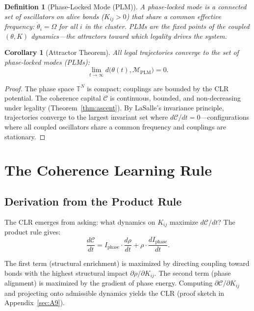 \documentclass[aps,prd,onecolumn,superscriptaddress,floatfix,12pt]{revtex4-2}
\newcommand{\Iphase}{I_{\text{phase}}}
\newtheorem{corollary}{Corollary}[section]
\newtheorem{definition}{Definition}[section]
\begin{document}
\begin{definition}[Phase-Locked Mode (PLM)]\label{def:plm}
A \emph{phase-locked mode} is a connected set of oscillators on alive bonds ($K_{ij} > 0$) that share a common effective frequency: $\dot{\theta}_i = \Omega$ for all $i$ in the cluster. PLMs are the fixed points of the coupled $(\theta, K)$ dynamics---the attractors toward which legality drives the system.
\end{definition}

\begin{corollary}[Attractor Theorem]\label{cor:attractor}
All legal trajectories converge to the set of phase-locked modes (PLMs):
\begin{equation}
\lim_{t \to \infty} d\bigl(\theta(t), \mathcal{M}_{\text{PLM}}\bigr) = 0.
\end{equation}
\end{corollary}

\begin{proof}
The phase space $\mathbb{T}^N$ is compact; couplings are bounded by the CLR potential. The coherence capital $\mathcal{C}$ is continuous, bounded, and non-decreasing under legality (Theorem~\ref{thm:ascent}). By LaSalle's invariance principle, trajectories converge to the largest invariant set where $d\mathcal{C}/dt = 0$---configurations where all coupled oscillators share a common frequency and couplings are stationary.
\end{proof}

\section{The Coherence Learning Rule}\label{sec:2}

\subsection{Derivation from the Product Rule}\label{sec:2-1}

The CLR emerges from asking: what dynamics on $K_{ij}$ maximize $d\mathcal{C}/dt$? The product rule gives:
\begin{equation}
\frac{d\mathcal{C}}{dt} = \Iphase \cdot \frac{d\rho}{dt} + \rho \cdot \frac{d\Iphase}{dt}.
\end{equation}

The first term (structural enrichment) is maximized by directing coupling toward bonds with the highest structural impact $\partial\rho/\partial K_{ij}$. The second term (phase alignment) is maximized by the gradient of phase energy. Computing $\partial\mathcal{C}/\partial K_{ij}$ and projecting onto admissible dynamics yields the CLR (proof sketch in Appendix~\ref{sec:A9}).
\end{document}
